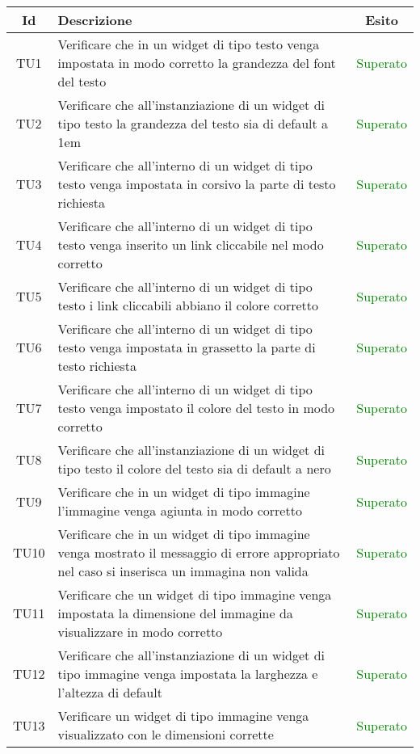 \begin{center}
	\begin{longtable}{|c|>{\centering}m{10cm}|c|}\hline
		Id & Descrizione & Esito\\ \hline
		TU1 & Verificare che in un widget di tipo testo venga impostata in modo corretto la grandezza del font del testo & \textcolor{Green}{Superato}\\ \hline
		TU2 & Verificare che all'instanziazione di un widget di tipo testo la grandezza del testo sia di default a 1em & \textcolor{Green}{Superato}\\ \hline
		TU3 & Verificare che all'interno di un widget di tipo testo venga impostata in corsivo la parte di testo richiesta & \textcolor{Green}{Superato}\\ \hline
		TU4 & Verificare che all'interno di un widget di tipo testo venga inserito un link cliccabile nel modo corretto & \textcolor{Green}{Superato}\\ \hline
		TU5 & Verificare che all'interno di un widget di tipo testo i link cliccabili abbiano il colore corretto & \textcolor{Green}{Superato}\\ \hline
		TU6 & Verificare che all'interno di un widget di tipo testo venga impostata in grassetto la parte di testo richiesta & \textcolor{Green}{Superato}\\ \hline
		TU7 & Verificare che all'interno di un widget di tipo testo venga impostato il colore del testo in modo corretto & \textcolor{Green}{Superato}\\ \hline
		TU8 & Verificare che all'instanziazione di un widget di tipo testo il colore del testo sia di default a nero & \textcolor{Green}{Superato}\\ \hline
		TU9 & Verificare che in un widget di tipo immagine l'immagine venga agiunta in modo corretto & \textcolor{Green}{Superato}\\ \hline
		TU10 & Verificare che in un widget di tipo immagine venga mostrato il messaggio di errore appropriato nel caso si inserisca un immagina non valida & \textcolor{Green}{Superato}\\ \hline
		TU11 & Verificare che un widget di tipo immagine venga impostata la dimensione del immagine da visualizzare in modo corretto & \textcolor{Green}{Superato}\\ \hline
		TU12 & Verificare che all'instanziazione di un widget di tipo immagine venga impostata la larghezza e l'altezza di default & \textcolor{Green}{Superato}\\ \hline
		TU13 & Verificare un widget di tipo immagine venga visualizzato con le dimensioni corrette & \textcolor{Green}{Superato}\\ \hline

\end{longtable}
\end{center}
